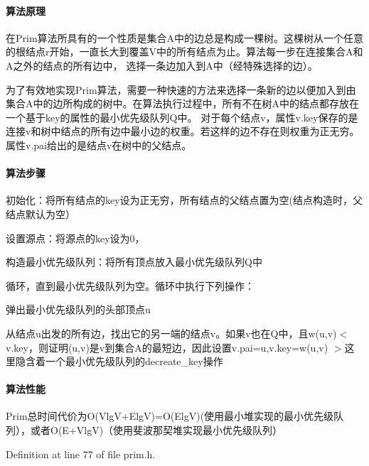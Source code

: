 \paragraph*{算法原理}

在\+Prim算法所具有的一个性质是集合\+A中的边总是构成一棵树。这棵树从一个任意的根结点r开始，一直长大到覆盖\+V中的所有结点为止。算法每一步在连接集合\+A和\+A之外的结点的所有边中， 选择一条边加入到\+A中（经特殊选择的边）。

为了有效地实现\+Prim算法，需要一种快速的方法来选择一条新的边以便加入到由集合\+A中的边所构成的树中。在算法执行过程中，所有不在树\+A中的结点都存放在一个基于key的属性的最小优先级队列\+Q中。 对于每个结点v，属性v.\+key保存的是连接v和树中结点的所有边中最小边的权重。若这样的边不存在则权重为正无穷。属性v.\+pai给出的是结点v在树中的父结点。

\paragraph*{算法步骤}


\begin{DoxyItemize}
\item 初始化：将所有结点的key设为正无穷，所有结点的父结点置为空(结点构造时，父结点默认为空）
\item 设置源点：将源点的key设为0，
\item 构造最小优先级队列：将所有顶点放入最小优先级队列\+Q中
\item 循环，直到最小优先级队列为空。循环中执行下列操作：
\begin{DoxyItemize}
\item 弹出最小优先级队列的头部顶点u
\item 从结点u出发的所有边，找出它的另一端的结点v。如果v也在\+Q中，且w(u,v)$<$v.\+key，则证明(u,v)是v到集合\+A的最短边，因此设置v.\+pai=u,v.\+key=w(u,v) $>$这里隐含着一个最小优先级队列的decreate\+\_\+key操作
\end{DoxyItemize}
\end{DoxyItemize}

\paragraph*{算法性能}

Prim总时间代价为\+O(Vlg\+V+\+Elg\+V)=O(\+Elg\+V)(使用最小堆实现的最小优先级队列），或者\+O(E+\+Vlg\+V)（使用斐波那契堆实现最小优先级队列） 

Definition at line 77 of file prim.\+h.

\hypertarget{namespace_introduction_to_algorithm_1_1_graph_algorithm_afe2bd83fca7df7e07ece9a59b8e7f5a6}{}
